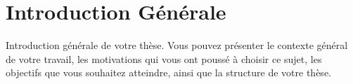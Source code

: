 \chapter*{Introduction Générale} 

Introduction générale de votre thèse. Vous pouvez présenter le contexte général de votre travail, les motivations qui vous ont poussé à choisir ce sujet, les objectifs que vous souhaitez atteindre, ainsi que la structure de votre thèse.